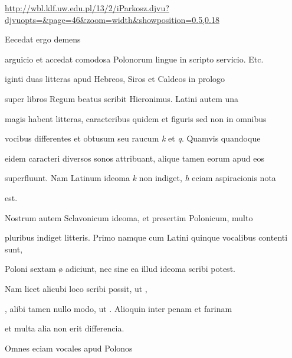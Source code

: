 \url{http://wbl.klf.uw.edu.pl/13/2/iParkosz.djvu?djvuopts=&page=46&zoom=width&showposition=0.5,0.18}

\begin{VerbatimLatin}[numbers=none,formatcom=\color{blue}]
Eecedat ergo demens 
\end{VerbatimLatin}
%
\renewcommand{\theFancyVerbLine}{06-0\arabic{FancyVerbLine}\phantom{a}}
%
\begin{VerbatimLatin}
arguicio et accedat comodosa Polonorum lingue in scripto servicio. Etc.

iginti duas litteras apud Hebreos, Siros et Caldeos in prologo

super libros Regum beatus scribit Hieronimus. Latini autem una

magis habent litteras, caracteribus quidem et figuris sed non in omnibus

vocibus differentes et obtusum seu raucum \textit{k} et \textit{q}. Quamvis quandoque

eidem caracteri diversos sonos attribuant, alique tamen eorum apud eos

superfluunt. Nam Latinum ideoma \textit{k} non indiget, \textit{h} eciam aspiracionis nota
\end{VerbatimLatin}
\renewcommand{\theFancyVerbLine}{\textcolor{green}{06-08\alph{FancyVerbLine}}}
\begin{VerbatimLatin}[firstnumber=1]
est.

\indentK Nostrum autem Sclavonicum ideoma, et presertim Polonicum, multo
\end{VerbatimLatin}
\renewcommand{\theFancyVerbLine}{06-0\arabic{FancyVerbLine}\phantom{a}}
%
\begin{VerbatimLatin}[firstnumber=9]
pluribus indiget litteris. Primo namque cum Latini quinque vocalibus contenti sunt,
\end{VerbatimLatin}
\renewcommand{\theFancyVerbLine}{06-\arabic{FancyVerbLine}\phantom{a}}
%
\begin{VerbatimLatin}[firstnumber=10]
Poloni  sextam ø adiciunt, nec sine ea illud ideoma scribi potest.

Nam licet alicubi loco   scribi possit, ut  , 

, alibi tamen nullo modo, ut  . Alioquin inter penam et farinam
\end{VerbatimLatin}
\renewcommand{\theFancyVerbLine}{\textcolor{green}{06-13\alph{FancyVerbLine}}}
\begin{VerbatimLatin}[firstnumber=1]
et multa alia non erit differencia.

\indentK Omnes eciam vocales apud Polonos
\end{VerbatimLatin}
